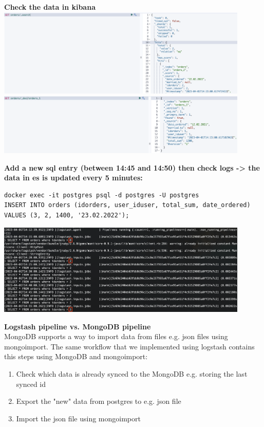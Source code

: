 \documentclass[14pt,a4paper]{extarticle}
\begin{document}
	\noindent \textbf{Check the data in kibana} \\
	\includegraphics[width=0.9\textwidth]{images/sc07.png}  \\
	\includegraphics[width=0.9\textwidth]{images/sc08.png} 

	\noindent \textbf{Add a new sql entry (between 14:45 and 14:50) then check logs -> the data in es is updated every 5 minutes:}
	\begin{lstlisting}[style=fish]
docker exec -it postgres psql -d postgres -U postgres
INSERT INTO orders (idorders, user_iduser, total_sum, date_ordered) VALUES (3, 2, 1400, '23.02.2022');
	\end{lstlisting}
	\includegraphics[width=0.9\textwidth]{images/sc09.png} 
	\newpage

	\noindent \textbf{Logstash pipeline vs. MongoDB pipeline} \\
	MongoDB supports a way to import data from files e.g. json files using mongoimport.
	The same workflow that we implemented using logstash contains this steps using MongoDB and mongoimport:
	\begin{enumerate}[noitemsep]
		\item Check which data is already synced to the MongoDB e.g. storing the last synced id
		\item Export the "new" data from postgres to e.g. json file
		\item Import the json file using mongoimport
	\end{enumerate}
\end{document}
